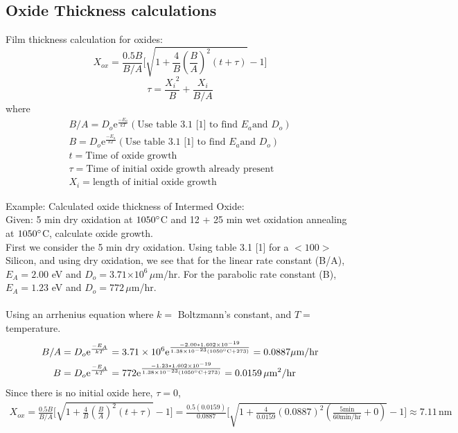 \documentclass{article}
\newcommand{\me}{\mathrm{e}}
\providecommand{\e}[1]{\ensuremath{\times 10^{#1}}}
\begin{document}
\subsection{Oxide Thickness calculations}
\label{sec:oxide}
Film thickness calculation for oxides:
\begin{equation}
X_{ox} = \frac{0.5B}{B/A}\Big[\sqrt{1 + \frac{4}{B}(\frac{B}{A})^2(t + \tau)} - 1\Big]
\end{equation}
\begin{equation}
\tau = \frac{{X_i}^2}{B} + \frac{X_i}{B/A}
\end{equation}
where
\begin{align*}
B/A = D_o\me^{\frac{-E_a}{kT}} (\text{Use table 3.1 [1] to find }E_a \text{and } D_o) \\
B = D_o\me^{\frac{-E_a}{kT}} (\text{Use table 3.1 [1] to find }E_a \text{and } D_o) \\
t = \text{Time of oxide growth} \\ 
\tau = \text{Time of initial oxide growth already present} \\
X_i = \text{length of initial oxide growth}
\end{align*}

Example: Calculated oxide thickness of Intermed Oxide: \\
Given: 5 min dry oxidation at $1050\degree$C and 12 + 25 min wet oxidation annealing at $1050\degree$C, calculate oxide growth. \\

First we consider the 5 min dry oxidation. Using table 3.1 [1] for a $<100>$ Silicon, and using dry oxidation, we see that for the linear rate constant (B/A), $E_A = 2.00$ eV and $D_o = 3.71\e{6} \, \mu$m/hr. For the parabolic rate constant (B), $E_A = 1.23$ eV and $D_o = 772\, \mu$m/hr. \\ \\
Using an arrhenius equation where $k =$ Boltzmann's constant, and $T = $ temperature. 
\begin{align*}
B/A &= D_o\me^{\frac{-E_A}{kT}} = 3.71\e{6}\me^{\frac{-2.00*1.602\e{-19}}{1.38\e{-23}(1050\degree\text{C} + 273)}} = 0.0887 \mu\text{m/hr} \\
B &= D_o\me^{\frac{-E_A}{kT}} = 772\me^{\frac{-1.23*1.602\e{-19}}{1.38\e{-23}(1050\degree\text{C} + 273)}} = 0.0159 \,{\mu\text{m}}^2\text{/hr}
\end{align*}
Since there is no initial oxide here, $\tau = 0$,
\begin{align*}
X_{ox} = \frac{0.5B}{B/A}\Big[\sqrt{1 + \frac{4}{B}(\frac{B}{A})^2(t + \tau)} - 1\Big] = \frac{0.5 (0.0159)}{0.0887}\Big[\sqrt{1 + \frac{4}{0.0159}(0.0887)^2(\frac{5\text{min}}{60\text{min/hr}} + 0)} - 1\Big] \approx 7.11 \, \text{nm}
\end{align*}
\end{document}
